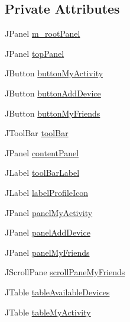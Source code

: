 \subsection*{Private Attributes}
\begin{DoxyCompactItemize}
\item 
J\+Panel \mbox{\hyperlink{classcom_1_1activitytracker_1_1_main_window_ac3d61c032aef87f12b1ae6f7dbf482c3}{m\+\_\+root\+Panel}}
\item 
J\+Panel \mbox{\hyperlink{classcom_1_1activitytracker_1_1_main_window_a6baf76b2b8ede1ba82fc6d096ddb580b}{top\+Panel}}
\item 
J\+Button \mbox{\hyperlink{classcom_1_1activitytracker_1_1_main_window_adec15801f8e16f769bd954e351a663fa}{button\+My\+Activity}}
\item 
J\+Button \mbox{\hyperlink{classcom_1_1activitytracker_1_1_main_window_af241d0ee8023ed099caa204419d74ccb}{button\+Add\+Device}}
\item 
J\+Button \mbox{\hyperlink{classcom_1_1activitytracker_1_1_main_window_a4d9543db1723fd7d1921f07cc92e2abb}{button\+My\+Friends}}
\item 
J\+Tool\+Bar \mbox{\hyperlink{classcom_1_1activitytracker_1_1_main_window_a2bfeba161ab34eb7d74679e174935995}{tool\+Bar}}
\item 
J\+Panel \mbox{\hyperlink{classcom_1_1activitytracker_1_1_main_window_aaa5ce3b10bff65231c65a3d4b33724b0}{content\+Panel}}
\item 
J\+Label \mbox{\hyperlink{classcom_1_1activitytracker_1_1_main_window_a67ae18d9e07bc8b7058c1363e0f12e30}{tool\+Bar\+Label}}
\item 
J\+Label \mbox{\hyperlink{classcom_1_1activitytracker_1_1_main_window_a05a555ba49d30b00573d07e5acd39e0a}{label\+Profile\+Icon}}
\item 
J\+Panel \mbox{\hyperlink{classcom_1_1activitytracker_1_1_main_window_a89833c824727a496f4a889177d4d3f3c}{panel\+My\+Activity}}
\item 
J\+Panel \mbox{\hyperlink{classcom_1_1activitytracker_1_1_main_window_a02f203d3c00a61d838fcee4657984584}{panel\+Add\+Device}}
\item 
J\+Panel \mbox{\hyperlink{classcom_1_1activitytracker_1_1_main_window_afc5efa70337b4b072b38c2cc30991473}{panel\+My\+Friends}}
\item 
J\+Scroll\+Pane \mbox{\hyperlink{classcom_1_1activitytracker_1_1_main_window_a4ef571b624e78e91f3ccad9234c0b5d3}{scroll\+Pane\+My\+Friends}}
\item 
J\+Table \mbox{\hyperlink{classcom_1_1activitytracker_1_1_main_window_a50012386053e035e7ae0fb993153b225}{table\+Available\+Devices}}
\item 
J\+Table \mbox{\hyperlink{classcom_1_1activitytracker_1_1_main_window_a0ad6d3ca1298275eba15a9ea189d4d9b}{table\+My\+Activity}}
\end{DoxyCompactItemize}


